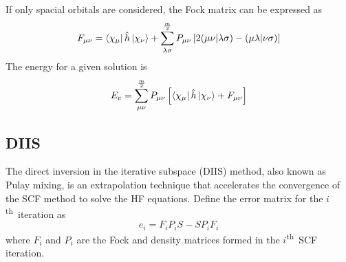 \documentclass[final,3p,times,twocolumn]{elsarticle}
\newcommand{\ssth}{\textsuperscript{th}}
\begin{document}
If only spacial orbitals are considered, the Fock matrix can be expressed as
\begin{equation} \label{eq:fockmatspace}
\begin{gathered}
F_{\mu\nu} = \bra{\chi_\mu} \hat h \ket{\chi_\nu} + \sum_{\lambda\sigma}^{\frac{m}{2}} P_{\mu\nu} \left[ 2(\mu\nu|\lambda\sigma) - (\mu\lambda|\nu\sigma)\right]
\end{gathered}
\end{equation} 
The energy for a given solution is
\begin{equation} \label{eq:hfenergy}
E_e = \sum_{\mu\nu}^{\frac{m}{2}} P_{\mu\nu} \left[ \bra{\chi_\mu} \hat h \ket{\chi_\nu} + F_{\mu\nu} \right]
\end{equation}

% 
% 
% 
% 
% 
% 
% 
%
%

\subsection{DIIS} \label{sec:diis}
The direct inversion in the iterative subspace (DIIS) method, also known as Pulay mixing, is an extrapolation technique that accelerates the convergence of the SCF method to solve the HF equations.\cite{diis} Define the error matrix for the $i$\ssth\ iteration as
\begin{equation} \label{eq:diiserror}
e_i = F_iP_iS - SP_iF_i
\end{equation}
where $F_i$ and $P_i$ are the Fock and density matrices formed in the $i$\ssth\ SCF iteration.
\end{document}
